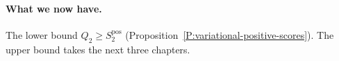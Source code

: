 \paragraph{What we now have.}
The lower bound $Q_2\ge S_2^{\mathrm{pos}}$
(Proposition~\ref{P:variational-positive-scores}). The upper bound takes the
next three chapters.
